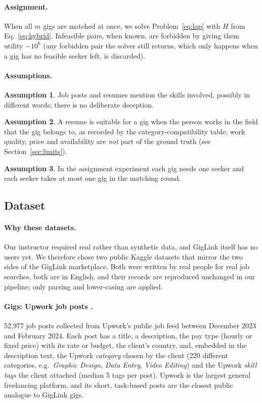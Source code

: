 \documentclass[12pt,a4paper]{article}
\numberwithin{equation}{section}
\theoremstyle{definition}
\newtheorem{assumption}{Assumption}
\theoremstyle{plain}
\newcommand{\DataGigsRaw}{52,977}
\newcommand{\DataGigTags}{5}
\begin{document}
\paragraph{Assignment.} When all $m$ gigs are matched at once, we solve Problem~\eqref{eq:lap} with $H$ from Eq.~\eqref{eq:hybrid}. Infeasible pairs, when known, are forbidden by giving them utility $-10^6$ (any forbidden pair the solver still returns, which only happens when a gig has no feasible seeker left, is discarded).

\paragraph{Assumptions.}
\begin{assumption}\label{as:text} Job posts and resumes mention the skills involved, possibly in different words; there is no deliberate deception.\end{assumption}
\begin{assumption}\label{as:gt} A resume is suitable for a gig when the person works in the field that the gig belongs to, as recorded by the category-compatibility table; work quality, price and availability are \emph{not} part of the ground truth (see Section~\ref{sec:limits}).\end{assumption}
\begin{assumption}\label{as:one} In the assignment experiment each gig needs one seeker and each seeker takes at most one gig in the matching round.\end{assumption}

\subsection{Dataset}\label{sec:data}
\paragraph{Why these datasets.} Our instructor required real rather than synthetic data, and GigLink itself has no users yet. We therefore chose two public Kaggle datasets that mirror the two sides of the GigLink marketplace. Both were written by real people for real job searches, both are in English, and their records are reproduced unchanged in our pipeline; only parsing and lower-casing are applied.

\paragraph{Gigs: Upwork job posts \citep{upworkdata}.} \DataGigsRaw{} job posts collected from Upwork's public job feed between December 2023 and February 2024. Each post has a title, a description, the pay type (hourly or fixed price) with its rate or budget, the client's country, and, embedded in the description text, the Upwork \emph{category} chosen by the client (220 different categories, e.g.\ \emph{Graphic Design}, \emph{Data Entry}, \emph{Video Editing}) and the Upwork \emph{skill tags} the client attached (median \DataGigTags{} tags per post). Upwork is the largest general freelancing platform, and its short, task-based posts are the closest public analogue to GigLink gigs.
\end{document}
